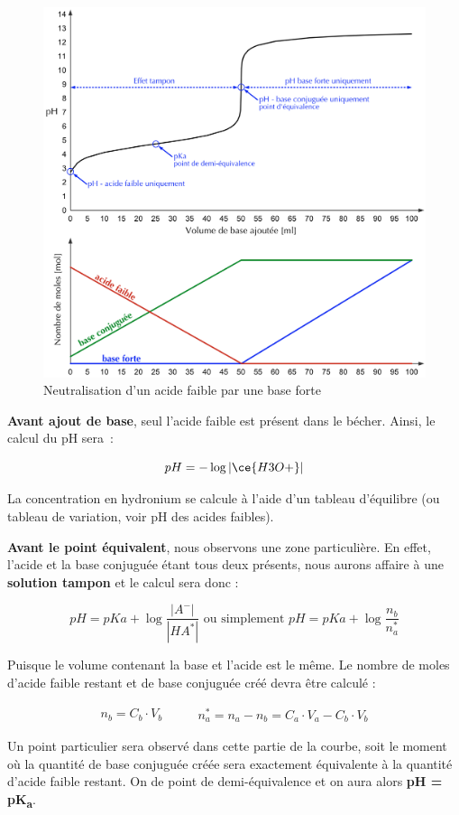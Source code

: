 \documentclass[
  11pt,
  a4paper,
  openany]{book}
\begin{document}
\begin{figure}

{\centering \includegraphics[width=0.65\linewidth]{images/courbes-titration-acide-faible} 

}

\caption{Neutralisation d'un acide faible par une base forte}\label{fig:acides-bases-6c}
\end{figure}

\textbf{Avant ajout de base}, seul l'acide faible est présent dans le bécher. Ainsi, le calcul du pH sera~:

\[
pH = - \log |\ce{H3O+}|
\]

La concentration en hydronium se calcule à l'aide d'un tableau d'équilibre (ou tableau de variation, voir pH des acides faibles).

\textbf{Avant le point équivalent}, nous observons une zone particulière. En effet, l'acide et la base conjuguée étant tous deux présents, nous aurons affaire à une \textbf{solution tampon} et le calcul sera donc :

\[
pH = pKa + \log \frac{|A^-|}{|HA^*|} \text{ ou simplement } pH = pKa + \log{\frac{n_b}{n_a^*}}
\]

Puisque le volume contenant la base et l'acide est le même. Le nombre de moles d'acide faible restant et de base conjuguée créé devra être calculé :

\[
\begin{split}
n_b = C_b \cdot V_b
\end{split}
\qquad
\begin{split}
n_a^* = n_a - n_b = C_a \cdot V_a - C_b \cdot V_b
\end{split}
\]

Un point particulier sera observé dans cette partie de la courbe, soit le moment où la quantité de base conjuguée créée sera exactement équivalente à la quantité d'acide faible restant. On de point de demi-équivalence et on aura alors \textbf{pH = pK\textsubscript{a}}.
\end{document}
